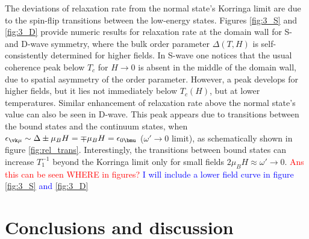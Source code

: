 \documentclass[prb,aps,showpacs,amsmath,twocolumn,10pt]{revtex4-1}
\newcommand{\blue}{\textcolor{blue}}
\newcommand{\red}{\textcolor{red}}
\begin{document}
The deviations of relaxation rate from the normal state's Korringa limit\cite{Korringa1950601} 
are due to the spin-flip transitions between the low-energy states. 
Figures \ref{fig:3_S} and \ref{fig:3_D}
provide numeric results for relaxation rate at the domain wall for S- and D-wave symmetry, 
where the bulk order parameter $\Delta(T,H)$ is self-consistently determined for higher fields. 
In S-wave one notices that the usual coherence peak below $T_c$ for $H\to0$ is absent in the middle of the domain wall, 
due to spatial asymmetry of the order parameter. 
However, a peak develops for higher fields, but it lies not immediately below $T_c(H)$, but at lower temperatures. 
Similar enhancement of relaxation rate above the normal state's value can also be seen in D-wave. 
This peak appears due to transitions between the bound states and the continuum states, when 
$\epsilon_{\vk\mu} \sim \Delta \pm \mu_B H = \mp \mu_B H = \epsilon_{0\bmu}$ 
($\omega' \to 0$ limit), as schematically shown in figure \ref{fig:rel_trans}. 
Interestingly, the transitions between bound states can increase $T_1^{-1}$ beyond the
Korringa limit only for small fields $2\mu_B H \approx \omega' \to 0$. 
\red{Ans this can be seen WHERE in figures?} \blue{I will include a lower field curve in figure \ref{fig:3_S} and \ref{fig:3_D}}


\section{Conclusions and discussion}
\label{sec:concl}
%
\end{document}
